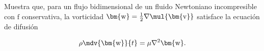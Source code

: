 \documentclass[../main.tex]{subfiles}
\begin{document}
\begin{problema}
	Muestra que, para un flujo bidimensional de un fluido Newtoniano incompresible
	con \(\bm{\mathrm{f}}\) conservativa, la vorticidad
	\(\bm{\mathrm{w}} = \tfrac{1}{2} \nabla \mul{\bm{\mathrm{v}}}\)
	satisface la ecuación de difusión

	\begin{equation*}
		\rho \mdv{\bm{\mathrm{w}}}{t} = \mu \nabla^{2}{\bm{\mathrm{w}}}.
	\end{equation*}
\end{problema}
\end{document}
